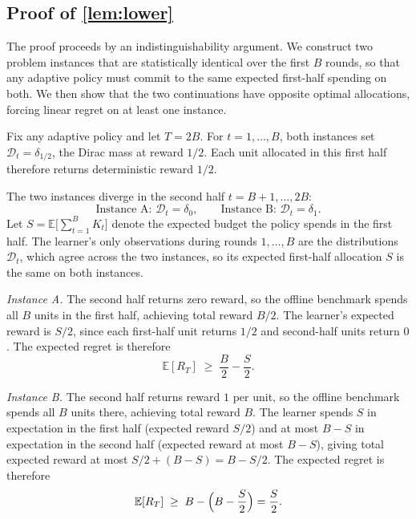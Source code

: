 \subsection{Proof of \texorpdfstring{\cref{lem:lower}}{Lemma 7 (Regret Lower Bound)}}
\label{sec:proof-lower}
%
The proof proceeds by an indistinguishability argument. We construct two problem instances that are statistically identical over the first $B$ rounds, so that any adaptive policy must commit to the same expected first-half spending on both. We then show that the two continuations have opposite optimal allocations, forcing linear regret on at least one instance.

Fix any adaptive policy and let $T = 2B$. For $t = 1, \ldots, B$, both instances set $\mathcal{D}_t = \delta_{1/2}$, the Dirac mass at reward $1/2$. Each unit allocated in this first half therefore returns deterministic reward $1/2$.

The two instances diverge in the second half $t = B+1, \ldots, 2B$:
\[
  \text{Instance A: } \mathcal{D}_t = \delta_0,
  \qquad
  \text{Instance B: } \mathcal{D}_t = \delta_1.
\]
Let $S = \mathbb{E}\bigl[\sum_{t=1}^B K_t\bigr]$ denote the expected budget the policy spends in the first half. The learner's only observations during rounds $1, \ldots, B$ are the distributions $\mathcal{D}_t$, which agree across the two instances, so its expected first-half allocation $S$ is the same on both instances.

\emph{Instance A.} The second half returns zero reward, so the offline benchmark spends all $B$ units in the first half, achieving total reward $B/2$. The learner's expected reward is $S/2$, since each first-half unit returns $1/2$ and second-half units return $0$. The expected regret is therefore
\[
  \mathbb{E}[R_T] \;\ge\; \frac{B}{2} - \frac{S}{2}.
\]

\emph{Instance B.} The second half returns reward $1$ per unit, so the offline benchmark spends all $B$ units there, achieving total reward $B$. The learner spends $S$ in expectation in the first half (expected reward $S/2$) and at most $B - S$ in expectation in the second half (expected reward at most $B - S$), giving total expected reward at most $S/2 + (B - S) = B - S/2$. The expected regret is therefore
\[
  \mathbb{E}[R_T] \;\ge\; B - \Bigl(B - \frac{S}{2}\Bigr) = \frac{S}{2}.
\]

